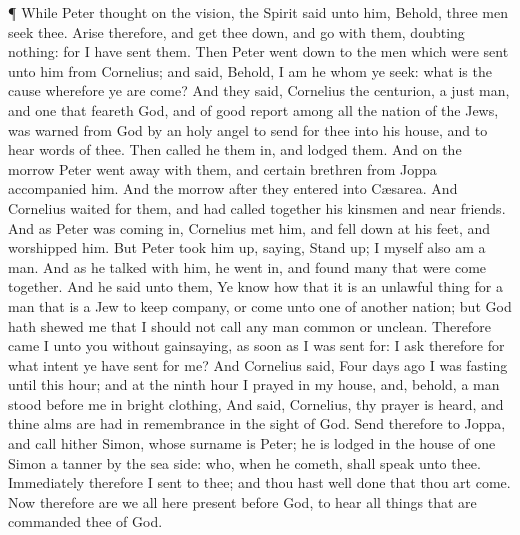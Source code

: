  ¶ While Peter thought on the vision, the Spirit said unto
him, Behold, three men seek thee.  Arise therefore, and get
thee down, and go with them, doubting nothing: for I have sent them.
 Then Peter went down to the men which were sent unto him
from Cornelius; and said, Behold, I am he whom ye seek: what is the
cause wherefore ye are come?  And they said, Cornelius the
centurion, a just man, and one that feareth God, and of good report
among all the nation of the Jews, was warned from God by an holy angel
to send for thee into his house, and to hear words of thee.
 Then called he them in, and lodged them. And on the morrow
Peter went away with them, and certain brethren from Joppa accompanied
him.  And the morrow after they entered into Cæsarea. And
Cornelius waited for them, and had called together his kinsmen and near
friends.  And as Peter was coming in, Cornelius met him,
and fell down at his feet, and worshipped him.  But Peter
took him up, saying, Stand up; I myself also am a man.  And
as he talked with him, he went in, and found many that were come
together.  And he said unto them, Ye know how that it is an
unlawful thing for a man that is a Jew to keep company, or come unto one
of another nation; but God hath shewed me that I should not call any man
common or unclean.  Therefore came I unto you without
gainsaying, as soon as I was sent for: I ask therefore for what intent
ye have sent for me?  And Cornelius said, Four days ago I
was fasting until this hour; and at the ninth hour I prayed in my house,
and, behold, a man stood before me in bright clothing,  And
said, Cornelius, thy prayer is heard, and thine alms are had in
remembrance in the sight of God.  Send therefore to Joppa,
and call hither Simon, whose surname is Peter; he is lodged in the house
of one Simon a tanner by the sea side: who, when he cometh, shall speak
unto thee.  Immediately therefore I sent to thee; and thou
hast well done that thou art come. Now therefore are we all here present
before God, to hear all things that are commanded thee of God.

